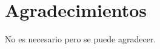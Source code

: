 \documentclass[../thesis/thesis.tex]{subfiles}
\begin{document}
\section*{{\large{} Agradecimientos }}

No es necesario pero se puede agradecer.
\end{document}
